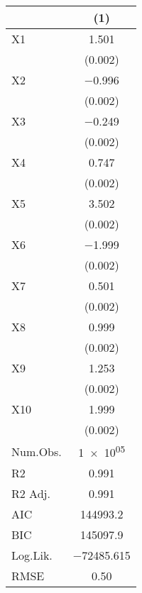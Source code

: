 \documentclass{article}
\begin{document}
\FloatBarrier
\begin{table}[htbp]
\centering
\begin{tabular}[t]{lc}
\toprule
  & (1)\\
\midrule
X1 & \num{1.501}\\
 & \vphantom{9} (\num{0.002})\\
X2 & \num{-0.996}\\
 & \vphantom{8} (\num{0.002})\\
X3 & \num{-0.249}\\
 & \vphantom{7} (\num{0.002})\\
X4 & \num{0.747}\\
 & \vphantom{6} (\num{0.002})\\
X5 & \num{3.502}\\
 & \vphantom{5} (\num{0.002})\\
X6 & \num{-1.999}\\
 & \vphantom{4} (\num{0.002})\\
X7 & \num{0.501}\\
 & \vphantom{3} (\num{0.002})\\
X8 & \num{0.999}\\
 & \vphantom{2} (\num{0.002})\\
X9 & \num{1.253}\\
 & \vphantom{1} (\num{0.002})\\
X10 & \num{1.999}\\
 & (\num{0.002})\\
\midrule
Num.Obs. & \num{1e+05}\\
R2 & \num{0.991}\\
R2 Adj. & \num{0.991}\\
AIC & \num{144993.2}\\
BIC & \num{145097.9}\\
Log.Lik. & \num{-72485.615}\\
RMSE & \num{0.50}\\
\bottomrule
\end{tabular}
\end{table}
\FloatBarrier
\end{document}
